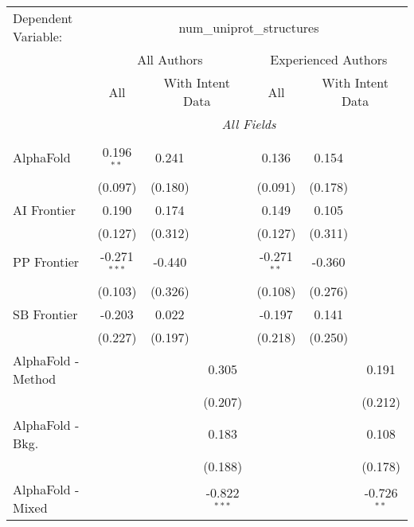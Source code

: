 \begingroup
\centering
\begin{tabular}{lcccccc}
   \tabularnewline \midrule \midrule
   Dependent Variable: & \multicolumn{6}{c}{num\_uniprot\_structures}\\
 & \multicolumn{3}{c}{All Authors} & \multicolumn{3}{c}{Experienced Authors} \\
\cmidrule(lr){2-4} \cmidrule(lr){5-7}
 & \multicolumn{1}{c}{All} & \multicolumn{2}{c}{With Intent Data} & \multicolumn{1}{c}{All} & \multicolumn{2}{c}{With Intent Data} \\
\cmidrule(lr){2-2} \cmidrule(lr){3-4} \cmidrule(lr){5-5} \cmidrule(lr){6-7}
 & \multicolumn{6}{c}{\textit{All Fields}} \\ \\
   AlphaFold            & 0.196$^{**}$   & 0.241   &                & 0.136         & 0.154   &   \\   
                        & (0.097)        & (0.180) &                & (0.091)       & (0.178) &   \\   
   AI Frontier          & 0.190          & 0.174   &                & 0.149         & 0.105   &   \\   
                        & (0.127)        & (0.312) &                & (0.127)       & (0.311) &   \\   
   PP Frontier          & -0.271$^{***}$ & -0.440  &                & -0.271$^{**}$ & -0.360  &   \\   
                        & (0.103)        & (0.326) &                & (0.108)       & (0.276) &   \\   
   SB Frontier          & -0.203         & 0.022   &                & -0.197        & 0.141   &   \\   
                        & (0.227)        & (0.197) &                & (0.218)       & (0.250) &   \\   
   AlphaFold - Method   &                &         & 0.305          &               &         & 0.191\\   
                        &                &         & (0.207)        &               &         & (0.212)\\   
   AlphaFold - Bkg.     &                &         & 0.183          &               &         & 0.108\\   
                        &                &         & (0.188)        &               &         & (0.178)\\   
   AlphaFold - Mixed    &                &         & -0.822$^{***}$ &               &         & -0.726$^{**}$\\   

\end{tabular}
